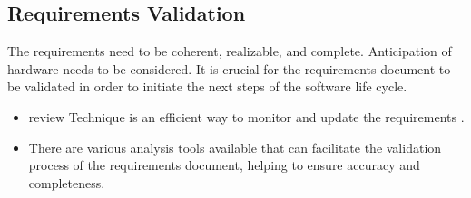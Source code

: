 \subsection{Requirements Validation}
The requirements need to be coherent, realizable, and complete. Anticipation of hardware needs to be considered. 
It is crucial for the requirements document to be validated in order to initiate the next steps of the software life cycle.

\begin{itemize}
    \item review Technique is an efficient way to monitor and update the requirements .
    \item There are various analysis tools available that can facilitate the validation process of the requirements document,
helping to ensure accuracy and completeness.
\end{itemize}

